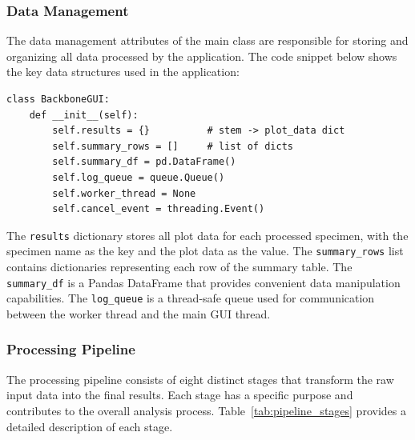 \documentclass[11pt,a4paper]{article}
\begin{document}
\subsubsection{Data Management}

The data management attributes of the main class are responsible for storing and organizing all data processed by the application. The code snippet below shows the key data structures used in the application:

\begin{lstlisting}
class BackboneGUI:
    def __init__(self):
        self.results = {}          # stem -> plot_data dict
        self.summary_rows = []     # list of dicts
        self.summary_df = pd.DataFrame()
        self.log_queue = queue.Queue()
        self.worker_thread = None
        self.cancel_event = threading.Event()
\end{lstlisting}

The \texttt{results} dictionary stores all plot data for each processed specimen, with the specimen name as the key and the plot data as the value. The \texttt{summary\_rows} list contains dictionaries representing each row of the summary table. The \texttt{summary\_df} is a Pandas DataFrame that provides convenient data manipulation capabilities. The \texttt{log\_queue} is a thread-safe queue used for communication between the worker thread and the main GUI thread.

\subsubsection{Processing Pipeline}

The processing pipeline consists of eight distinct stages that transform the raw input data into the final results. Each stage has a specific purpose and contributes to the overall analysis process. Table~\ref{tab:pipeline_stages} provides a detailed description of each stage.
\end{document}
